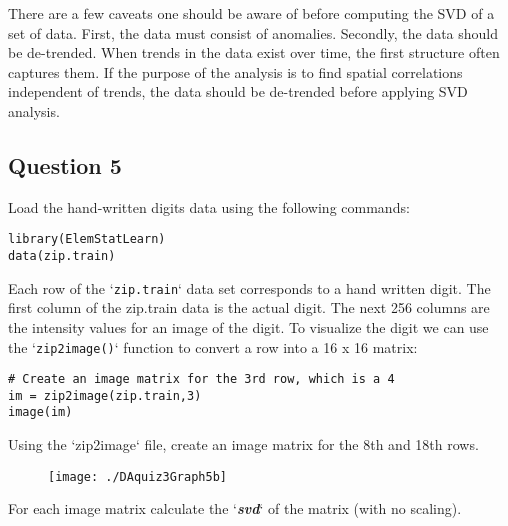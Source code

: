 \documentclass[12pt]{article}
\begin{document}
There are a few caveats one should be aware of before computing the SVD of a set of data. First, the data must consist of anomalies. Secondly, the data should be de-trended. When trends in the data exist over time, the first structure often captures them. If the purpose of the analysis is to find spatial correlations independent of trends, the data should be de-trended before applying SVD analysis. 

\newpage

\subsection*{Question 5}
Load the hand-written digits data using the following commands:

\begin{framed}
\begin{verbatim}
library(ElemStatLearn)
data(zip.train)
\end{verbatim}
\end{framed}

Each row of the `\texttt{zip.train}` data set corresponds to a hand written digit. The
first column of the zip.train data is the actual digit. The next 256 columns
are the intensity values for an image of the digit. To visualize the digit we
can use the `\texttt{zip2image()}` function to convert a row into a 16 x 16 matrix:

\begin{framed}
\begin{verbatim}
# Create an image matrix for the 3rd row, which is a 4
im = zip2image(zip.train,3)
image(im)
\end{verbatim}
\end{framed}


Using the `zip2image` file, create an image matrix for the 8th and 18th rows.
\begin{figure}
\centering
\texttt{[image: ./DAquiz3Graph5b]}
\caption{}
\label{fig:DAquiz3Graph5}
\end{figure}
For each image matrix calculate the `\textit{\textbf{svd}}` of the matrix (with no scaling). 
\end{document}
